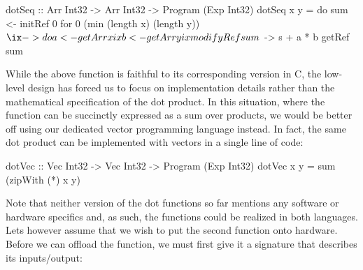 \documentclass[../paper.tex]{subfiles}
\begin{document}
\begin{code}
dotSeq :: Arr Int32 -> Arr Int32 -> Program (Exp Int32)
dotSeq x y = do
  sum <- initRef 0
  for 0 (min (length x) (length y)) $ \ix -> do
    a <- getArr x ix
    b <- getArr y ix
    modifyRef sum $ \s -> s + a * b
  getRef sum
\end{code}

While the above function is faithful to its corresponding version in C, the low-level design has forced us to focus on implementation details rather than the mathematical specification of the dot product. In this situation, where the function can be succinctly expressed as a sum over products, we would be better off using our dedicated vector programming language instead. In fact, the same dot product can be implemented with vectors in a single line of code:

\begin{code}
dotVec :: Vec Int32 -> Vec Int32 -> Program (Exp Int32)
dotVec x y = sum (zipWith (*) x y)
\end{code}


Note that neither version of the dot functions so far mentions any software or hardware specifics and, as such, the functions could be realized in both languages. Lets however assume that we wish to put the second function onto hardware. Before we can offload the function, we must first give it a signature that describes its inputs/output:



\end{document}
